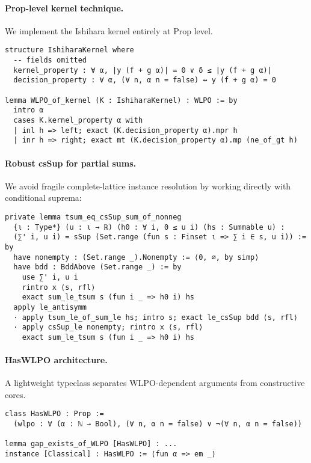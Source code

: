 \documentclass[11pt]{article}
\begin{document}
\paragraph{Prop-level kernel technique.}
We implement the Ishihara kernel entirely at Prop level.

\begin{lstlisting}[caption={Ishihara kernel (illustrative Lean snippet)}]
structure IshiharaKernel where
  -- fields omitted
  kernel_property : ∀ α, |y (f + g α)| = 0 ∨ δ ≤ |y (f + g α)|
  decision_property : ∀ α, (∀ n, α n = false) ↔ y (f + g α) = 0

lemma WLPO_of_kernel (K : IshiharaKernel) : WLPO := by
  intro α
  cases K.kernel_property α with
  | inl h => left; exact (K.decision_property α).mpr h
  | inr h => right; exact mt (K.decision_property α).mp (ne_of_gt h)
\end{lstlisting}

\paragraph{Robust csSup for partial sums.}
We avoid fragile complete-lattice instance resolution by working directly with conditional suprema:
\begin{lstlisting}[caption={tsum equals csSup of finite partial sums}]
private lemma tsum_eq_csSup_sum_of_nonneg
  {ι : Type*} (u : ι → ℝ) (h0 : ∀ i, 0 ≤ u i) (hs : Summable u) :
  (∑' i, u i) = sSup (Set.range (fun s : Finset ι => ∑ i ∈ s, u i)) := by
  have nonempty : (Set.range _).Nonempty := ⟨0, ∅, by simp⟩
  have bdd : BddAbove (Set.range _) := by
    use ∑' i, u i
    rintro x ⟨s, rfl⟩
    exact sum_le_tsum s (fun i _ => h0 i) hs
  apply le_antisymm
  · apply tsum_le_of_sum_le hs; intro s; exact le_csSup bdd ⟨s, rfl⟩
  · apply csSup_le nonempty; rintro x ⟨s, rfl⟩
    exact sum_le_tsum s (fun i _ => h0 i) hs
\end{lstlisting}

\paragraph{HasWLPO architecture.}
A lightweight typeclass separates WLPO-dependent arguments from constructive cores.

\begin{lstlisting}[caption={WLPO typeclass sketch}]
class HasWLPO : Prop :=
  (wlpo : ∀ (α : ℕ → Bool), (∀ n, α n = false) ∨ ¬(∀ n, α n = false))

lemma gap_exists_of_WLPO [HasWLPO] : ...
instance [Classical] : HasWLPO := ⟨fun α => em _⟩
\end{lstlisting}
\end{document}
